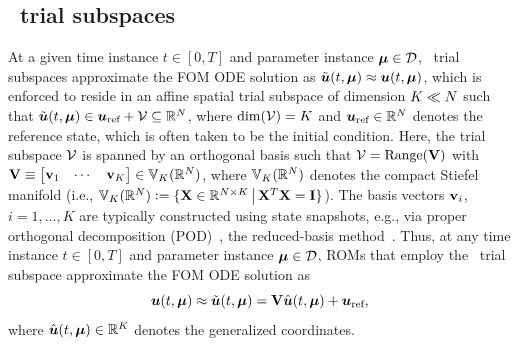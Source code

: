 \documentclass[3p,computermodern,10pt]{elsarticle}
\begin{document}
\subsection{\spatialAcronym\ trial subspaces}
At a given time instance 
$t\in[0,T]$ and parameter instance $\boldsymbol \mu \in \mathcal{D}$,
\spatialAcronym\ trial subspaces approximate the FOM ODE solution
	as $\tilde{\boldsymbol u}(t,\boldsymbol \mu)\approx\boldsymbol u(t,\boldsymbol \mu)$, which is enforced to reside in an
	affine spatial trial subspace of dimension $K\ll N$ such that
	$\tilde{\boldsymbol u}(t,\boldsymbol \mu) \in
	\boldsymbol u_{\text{ref}} +\mathcal{V}
\subseteq\mathbb{R}^{N}$, where $\dim(\mathcal{V}) = K$
and $\boldsymbol u_{\text{ref}} \in \mathbb{R}^{N}$ denotes the reference state, which
	is often taken to be the initial condition.
Here, the trial subspace
$\mathcal{V}$ 
is spanned by an orthogonal basis such that
$ \mathcal{V}= \text{Range}(\mathbf{V})$
with 
$ \mathbf{V} \equiv \begin{bmatrix}  \mathbf{v}_1  & \cdots &  \mathbf{v}_K \end{bmatrix}
	\in \mathbb{V}_{K}(\mathbb{R}^{N})$, where $\mathbb{V}_{K}(\mathbb{R}^{N})$ denotes the compact Stiefel manifold (i.e.,  $
	\mathbb{V}_{K}(\mathbb{R}^{N})\vcentcolon=
	\{ \mathbf{X} \in \mathbb{R}^{N
	\times K}\, \big|\, \mathbf{X}^T \mathbf{X} = \mathbf{I} \}$).
The basis vectors $\mathbf{v}_i$, $i=1,\ldots,K$ are typically constructed
using state snapshots, e.g., via
proper orthogonal decomposition (POD)~\cite{berkooz_turbulence_pod}, the reduced-basis method~\cite{rb_1,rb_2,rb_3,NgocCuong2005,Rozza2008}. 
Thus, at any time instance $t\in[0,T]$ and parameter instance $\boldsymbol \mu \in \mathcal{D}$, ROMs that employ the  \spatialAcronym\
trial subspace approximate the FOM ODE solution as
\begin{equation}\label{eq:affine_trialspace}
\boldsymbol u(t,\boldsymbol \mu)  \approx \tilde{\boldsymbol u}(t,\boldsymbol \mu) = \mathbf{V}  \hat{\boldsymbol u}(t,\boldsymbol \mu) + \boldsymbol u_{\text{ref}},
\end{equation}
where $\hat{\boldsymbol u}(t,\boldsymbol \mu) \in \mathbb{R}^{K}$ denotes the generalized
coordinates. 
\end{document}
